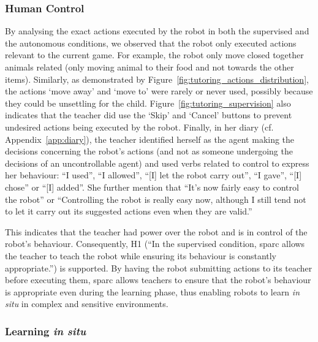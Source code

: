 \subsubsection{Human Control} \label{sec:tuto_control}
By analysing the exact actions executed by the robot in both the supervised and the autonomous conditions, we observed that the robot only executed actions relevant to the current game. For example, the robot only move closed together animals related (only moving animal to their food and not towards the other items). Similarly, as demonstrated by Figure~\ref{fig:tutoring_actions_distribution}, the actions `move away' and `move to' were rarely or never used, possibly because they could be unsettling for the child. Figure~\ref{fig:tutoring_supervision} also indicates that the teacher did use the `Skip' and `Cancel' buttons to prevent undesired actions being executed by the robot. Finally, in her diary (cf. Appendix~\ref{app:diary}), the teacher identified herself as the agent making the decisions concerning the robot's actions (and not as someone undergoing the decisions of an uncontrollable agent) and used verbs related to control to express her behaviour: ``I used'', ``I allowed'', ``[I] let the robot carry out'', ``I gave'', ``[I] chose'' or ``[I] added''. She further mention that ``It’s now fairly easy to control the robot'' or ``Controlling the robot is really easy now, although I still tend not to let it carry out its suggested actions even when they are valid.'' 

This indicates that the teacher had power over the robot and is in control of the robot's behaviour. Consequently, H1 (``In the supervised condition, \gls{sparc} allows the teacher to teach the robot while ensuring its behaviour is constantly appropriate.'') is supported. By having the robot submitting actions to its teacher before executing them, \gls{sparc} allows teachers to ensure that the robot's behaviour is appropriate even during the learning phase, thus enabling robots to learn \emph{in situ} in complex and sensitive environments.

\subsubsection{Learning \emph{in situ}}

